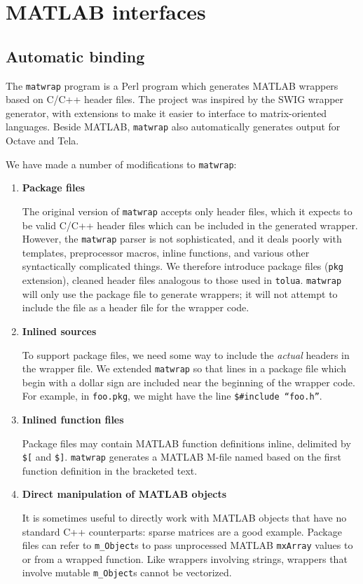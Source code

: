 \documentclass{article}
\newcommand{\ttt}[1]{\texttt{#1}}
\begin{document}

\section{MATLAB interfaces}
\label{section-matlab-interface}


\subsection{Automatic binding}

The \ttt{matwrap} program is a Perl program which generates MATLAB
wrappers based on C/C++ header files.  The project was inspired by the
SWIG wrapper generator, with extensions to make it easier to interface
to matrix-oriented languages.  Beside MATLAB, \ttt{matwrap} also
automatically generates output for Octave and Tela.

We have made a number of modifications to \ttt{matwrap}:
\begin{enumerate}
  \item \textbf{Package files}

  The original version of \ttt{matwrap} accepts only header files,
  which it expects to be valid C/C++ header files which can be
  included in the generated wrapper.  However, the \ttt{matwrap}
  parser is not sophisticated, and it deals poorly with templates,
  preprocessor macros, inline functions, and various other
  syntactically complicated things.  We therefore introduce package
  files (\ttt{pkg} extension), cleaned header files analogous to those
  used in \ttt{tolua}.  \ttt{matwrap} will only use the package file
  to generate wrappers; it will not attempt to include the file as a
  header file for the wrapper code.

  \item \textbf{Inlined sources}

  To support package files, we need some way to include the
  \emph{actual} headers in the wrapper file.  We extended
  \ttt{matwrap} so that lines in a package file which begin with a
  dollar sign are included near the beginning of the wrapper code.
  For example, in \ttt{foo.pkg}, we might have the line
  \ttt{\$\#include ``foo.h''}.

  \item \textbf{Inlined function files}

  Package files may contain MATLAB function definitions inline,
  delimited by \ttt{\$[} and \ttt{\$]}.  \ttt{matwrap} generates a
  MATLAB M-file named based on the first function definition in the
  bracketed text.

  \item \textbf{Direct manipulation of MATLAB objects}

  It is sometimes useful to directly work with MATLAB objects that
  have no standard C++ counterparts: sparse matrices are a good
  example.  Package files can refer to \ttt{m\_Object}s to pass
  unprocessed MATLAB \ttt{mxArray} values to or from a wrapped
  function.  Like wrappers involving strings, wrappers that involve
  mutable \ttt{m\_Object}s cannot be vectorized.

\end{enumerate}
\end{document}
